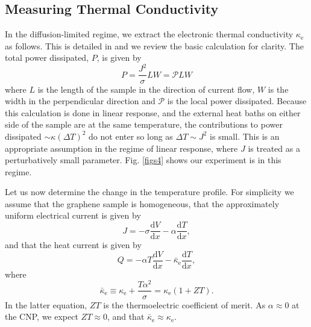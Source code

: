 \documentclass[10pt, oneside]{book}
\begin{document}
\begin{doublespace}
\begin{appendix}
\section{Measuring Thermal Conductivity}
In the diffusion-limited regime, we extract the electronic thermal conductivity $\kappa_{\mathrm{e}}$ as follows.    This is detailed in \cite{fong} and we review the basic calculation for clarity.   The total power dissipated, $P$, is given by \begin{equation}
P = \frac{J^2}{\sigma} LW = \mathcal{P}LW  \label{eqp2}
\end{equation}
where $L$ is the length of the sample in the direction of current flow,  $W$ is the width in the perpendicular direction and $\mathcal{P}$ is the local power dissipated.  Because this calculation is done in linear response, and the external heat baths on either side of the sample are at the same temperature,  the contributions to power dissipated $\sim \kappa (\Delta T)^2$ do not enter so long as $\Delta T \sim J^2$ is  small.   This is an appropriate assumption in the regime of linear response, where $J$ is treated as a perturbatively small parameter.    Fig. \ref{figs4} shows our experiment is in this regime.

Let us now determine the change in the temperature profile.   For simplicity we assume that the graphene sample is homogeneous, that the approximately uniform electrical current is given by \begin{equation}
J = -\sigma \frac{\mathrm{d}V}{\mathrm{d}x} - \alpha \frac{\mathrm{d}T}{\mathrm{d}x},  \label{S7}
\end{equation}
and that the heat current is given by \begin{equation}
Q = -\alpha T\frac{\mathrm{d}V}{\mathrm{d}x} - \bar\kappa_{\mathrm{e}} \frac{\mathrm{d}T}{\mathrm{d}x},  \label{S8}
\end{equation}
where \begin{equation}
\bar\kappa_{\mathrm{e}} \equiv \kappa_{\mathrm{e}} + \frac{T\alpha^2}{\sigma} = \kappa_{\mathrm{e}}(1+ZT).
\end{equation}
In the latter equation,  $ZT$ is the thermoelectric coefficient of merit.    As $\alpha \approx 0$ at the CNP,  we expect $ZT\approx 0$,  and that $\bar\kappa_{\mathrm{e}}\approx \kappa_{\mathrm{e}}$. 


\end{appendix}
\end{doublespace}
\end{document}
